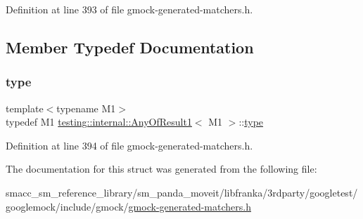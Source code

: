 Definition at line 393 of file gmock-\/generated-\/matchers.\+h.



\subsection{Member Typedef Documentation}
\mbox{\label{structtesting_1_1internal_1_1AnyOfResult1_a4c55b5cf196c93e2a822bc99625f6797}} 
\subsubsection{\texorpdfstring{type}{type}}
{\footnotesize\ttfamily template$<$typename M1$>$ \\
typedef M1 \hyperlink{structtesting_1_1internal_1_1AnyOfResult1}{testing\+::internal\+::\+Any\+Of\+Result1}$<$ M1 $>$\+::\hyperlink{structtesting_1_1internal_1_1AnyOfResult1_a4c55b5cf196c93e2a822bc99625f6797}{type}}



Definition at line 394 of file gmock-\/generated-\/matchers.\+h.



The documentation for this struct was generated from the following file\+:\begin{DoxyCompactItemize}
\item 
smacc\+\_\+sm\+\_\+reference\+\_\+library/sm\+\_\+panda\+\_\+moveit/libfranka/3rdparty/googletest/googlemock/include/gmock/\hyperlink{gmock-generated-matchers_8h}{gmock-\/generated-\/matchers.\+h}\end{DoxyCompactItemize}

